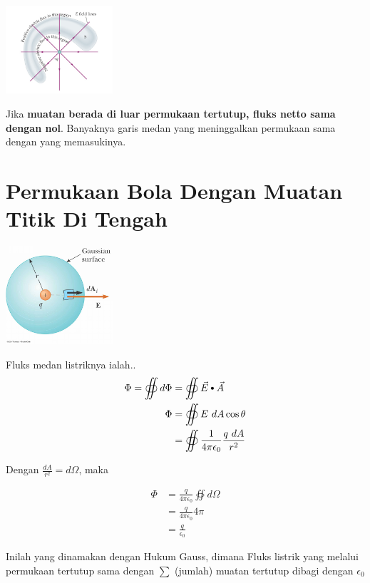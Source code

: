 \documentclass[twocolumn, 11pt]{article}%
\newcommand\sbullet[1][.5]{\mathbin{\ThisStyle{\vcenter{\hbox{%
  \scalebox{#1}{$\SavedStyle\bullet$}}}}}%
}
\begin{document}
    \begin{center}
        \includegraphics[width=150px]{7.png}
    \end{center}

    Jika \textbf{muatan berada di luar permukaan tertutup, fluks netto sama dengan nol}. Banyaknya garis medan yang meninggalkan permukaan sama dengan yang memasukinya.

    \section{Permukaan Bola Dengan Muatan Titik Di Tengah}%

    \begin{center}
        \includegraphics[width=150px]{8.png}
    \end{center}

    Fluks medan listriknya ialah..
    \begin{align*}
        \Phi = \oiint d \Phi &= \oiint \vec E \sbullet[.75] \vec A\\
        \Phi &= \oiint E\ dA \cos \theta\\
             &= \oiint \frac1{4\pi \epsilon_0} \frac{q\ dA}{r^2}
    \end{align*}

    Dengan $\displaystyle \frac{dA}{r^2}=d\Omega$, maka

    \begin{align*}
        \Phi &= \frac{q}{4\pi \epsilon_0} \oiint d\Omega\\
             &= \frac{q}{4\pi \epsilon_0} 4\pi\\
             &= \frac{q}{\epsilon_0}
    \end{align*}
    
    Inilah yang dinamakan dengan Hukum Gauss, dimana Fluks listrik yang melalui permukaan tertutup sama dengan $\sum$ (jumlah) muatan tertutup dibagi dengan $\epsilon_0$
    
\end{document}
